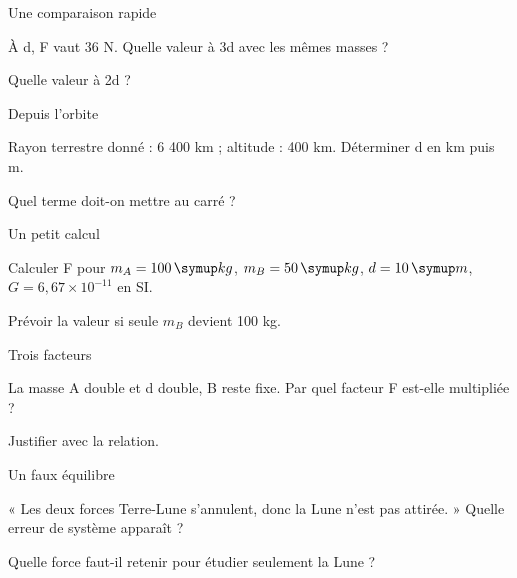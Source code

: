 \par\noindent\begin{minipage}{\linewidth}
\begin{exercice}[2]{Une comparaison rapide}
\begin{questions}
\item À d, F vaut 36 N. Quelle valeur à 3d avec les mêmes masses ?
\item Quelle valeur à 2d ?
\end{questions}
\end{exercice}
\end{minipage}
\par\noindent\begin{minipage}{\linewidth}
\begin{exercice}[2]{Depuis l’orbite}
\begin{questions}
\item Rayon terrestre donné : 6 400 km ; altitude : 400 km. Déterminer d en km puis m.
\item Quel terme doit-on mettre au carré ?
\end{questions}
\end{exercice}
\end{minipage}
\par\noindent\begin{minipage}{\linewidth}
\begin{exercice}[2]{Un petit calcul}
\begin{questions}
\item Calculer F pour $m_A=100\unite{kg}$, $m_B=50\unite{kg}$, $d=10\unite m$, $G=6{,}67\times10^{-11}$ en SI.
\item Prévoir la valeur si seule $m_B$ devient 100 kg.
\end{questions}
\end{exercice}
\end{minipage}
\clearpage{}
\par\noindent\begin{minipage}{\linewidth}
\begin{exercice}[3]{Trois facteurs}
\begin{questions}
\item La masse A double et d double, B reste fixe. Par quel facteur F est-elle multipliée ?
\item Justifier avec la relation.
\end{questions}
\end{exercice}
\end{minipage}
\par\noindent\begin{minipage}{\linewidth}
\begin{exercice}[3]{Un faux équilibre}
\begin{questions}
\item « Les deux forces Terre-Lune s’annulent, donc la Lune n’est pas attirée. » Quelle erreur de système apparaît ?
\item Quelle force faut-il retenir pour étudier seulement la Lune ?
\end{questions}
\end{exercice}
\end{minipage}
